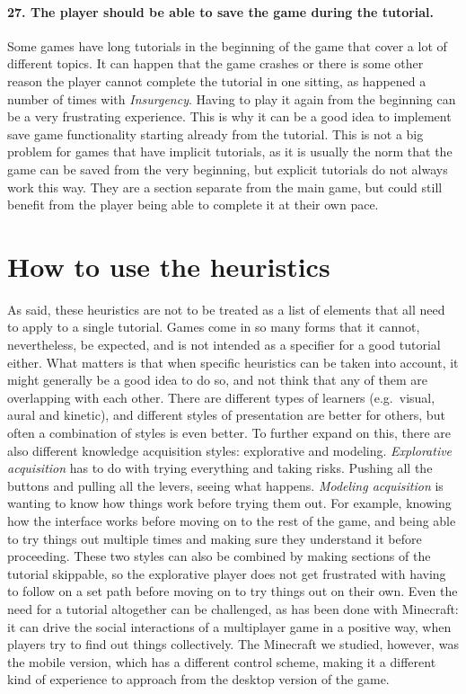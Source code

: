\paragraph{27. The player should be able to save the game during the tutorial.}
Some games have long tutorials in the beginning of the game that cover a lot of different topics. It can happen that the game crashes or there is some other reason the player cannot complete the tutorial in one sitting, as happened a number of times with \textit{Insurgency}. Having to play it again from the beginning can be a very frustrating experience. This is why it can be a good idea to implement save game functionality starting already from the tutorial. This is not a big problem for games that have implicit tutorials, as it is usually the norm that the game can be saved from the very beginning, but explicit tutorials do not always work this way. They are a section separate from the main game, but could still benefit from the player being able to complete it at their own pace.

\section{How to use the heuristics}

As said, these heuristics are not to be treated as a list of elements that all need to apply to a single tutorial. Games come in so many forms that it cannot, nevertheless, be expected, and is not intended as a specifier for a good tutorial either. What matters is that when specific heuristics can be taken into account, it might generally be a good idea to do so, and not think that any of them are overlapping with each other. There are different types of learners (e.g.\ visual, aural and kinetic), and different styles of presentation are better for others, but often a combination of styles is even better. To further expand on this, there are also different knowledge acquisition styles: explorative and modeling. \textit{Explorative acquisition} has to do with trying everything and taking risks. Pushing all the buttons and pulling all the levers, seeing what happens. \textit{Modeling acquisition} is wanting to know how things work before trying them out. For example, knowing how the interface works before moving on to the rest of the game, and being able to try things out multiple times and making sure they understand it before proceeding. These two styles can also be combined by making sections of the tutorial skippable, so the explorative player does not get frustrated with having to follow on a set path before moving on to try things out on their own. \cite{Ray2010} Even the need for a tutorial altogether can be challenged, as has been done with Minecraft: it can drive the social interactions of a multiplayer game in a positive way, when players try to find out things collectively. \cite{Wawro2015} The Minecraft we studied, however, was the mobile version, which has a different control scheme, making it a different kind of experience to approach from the desktop version of the game.

